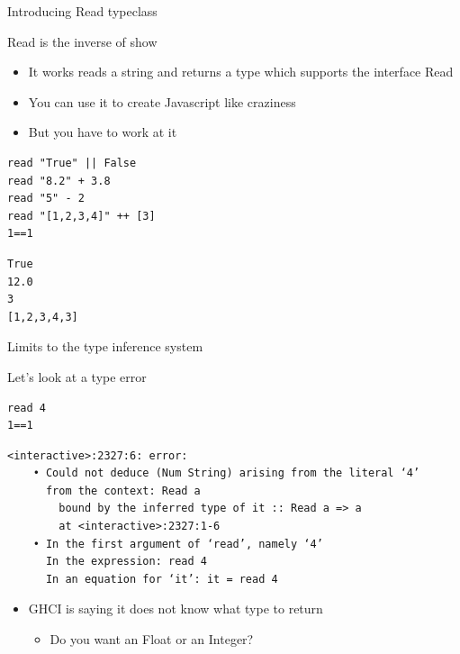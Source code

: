 \documentclass[presetation]{beamer}
\begin{document}
\begin{frame}[fragile,label={sec:org7472a15}]{Introducing Read typeclass}
 \begin{block}{Read is the inverse of show}
\begin{itemize}
\item It works reads a string and returns a type which supports the interface Read
\end{itemize}
\pause
\begin{itemize}
\item You can use it to create Javascript like craziness
\end{itemize}
\pause
\begin{itemize}
\item \alert{But you have to work at it}
\end{itemize}
\begin{verbatim}
read "True" || False                          
read "8.2" + 3.8                                    
read "5" - 2         
read "[1,2,3,4]" ++ [3]
1==1
\end{verbatim}

\begin{verbatim}
True
12.0
3
[1,2,3,4,3]
\end{verbatim}
\end{block}
\end{frame}

\begin{frame}[fragile,label={sec:org2d1d835}]{Limits to the type inference system}
 \begin{block}{Let's look at a type error}
\begin{verbatim}
read 4
1==1
\end{verbatim}

\begin{verbatim}
<interactive>:2327:6: error:
    • Could not deduce (Num String) arising from the literal ‘4’
      from the context: Read a
        bound by the inferred type of it :: Read a => a
        at <interactive>:2327:1-6
    • In the first argument of ‘read’, namely ‘4’
      In the expression: read 4
      In an equation for ‘it’: it = read 4
\end{verbatim}

\begin{itemize}
\item GHCI is saying it does not know what type to return
\begin{itemize}
\item Do you want an Float or an Integer?
\end{itemize}
\end{itemize}
\end{block}
\end{frame}
\end{document}
